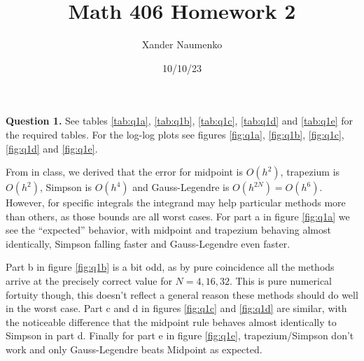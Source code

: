 \documentclass[letterpaper, reqno,11pt]{article}
\begin{document}
\title{Math 406 Homework 2}
\date{10/10/23}
\author{Xander Naumenko}
\maketitle

{\medskip\noindent\bf Question 1.} See tables \ref{tab:q1a}, \ref{tab:q1b}, \ref{tab:q1c}, \ref{tab:q1d} and \ref{tab:q1e} for the required tables. For the log-log plots see figures \ref{fig:q1a}, \ref{fig:q1b}, \ref{fig:q1c}, \ref{fig:q1d} and \ref{fig:q1e}.

From in class, we derived that the error for midpoint is $O(h^{2})$, trapezium is $O(h^{2})$, Simpson is $O(h^{4})$ and Gauss-Legendre is $O(h^{2N})=O(h^{6})$. However, for specific integrals the integrand may help particular methods more than others, as those bounds are all worst cases. For part a in figure \ref{fig:q1a} we see the ``expected'' behavior, with midpoint and trapezium behaving almost identically, Simpson falling faster and Gauss-Legendre even faster.

Part b in figure \ref{fig:q1b} is a bit odd, as by pure coincidence all the methods arrive at the precisely correct value for $N=4,16,32$. This is pure numerical fortuity though, this doesn't reflect a general reason these methods should do well in the worst case. Part c and d in figures \ref{fig:q1c} and \ref{fig:q1d} are similar, with the noticeable difference that the midpoint rule behaves almost identically to Simpson in part d. Finally for part e in figure \ref{fig:q1e}, trapezium/Simpson don't work and only Gauss-Legendre beats Midpoint as expected.
\end{document}
